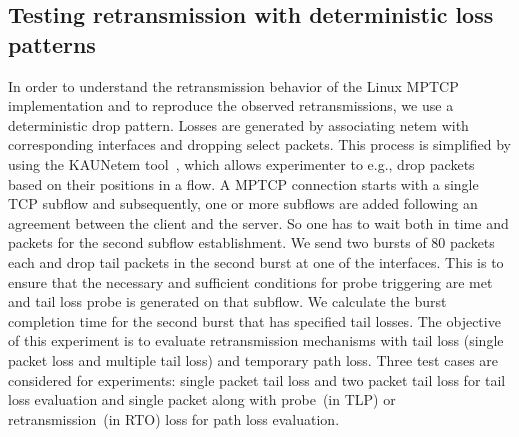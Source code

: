 \documentclass[10pt,conference]{IEEEtran}
\begin{document}
\begin{center}
\begin{table}
\end{table}
\end{center}


\subsection{Testing retransmission with deterministic loss patterns}
In order to understand the retransmission behavior of the Linux MPTCP implementation and to reproduce the observed retransmissions, we use a deterministic drop pattern. Losses are generated by associating netem with corresponding interfaces and dropping select packets. This process is simplified by using the KAUNetem tool~\cite{Garcia2016}, which allows experimenter to e.g., drop packets based on their positions in a flow. A MPTCP connection starts with a single TCP subflow and subsequently, one or more subflows are added following an agreement between the client and the server. So one has to wait both in time and packets for the second subflow establishment. We send two bursts of 80 packets each and drop tail packets in the second burst at one of the interfaces. This is to ensure that the necessary and sufficient conditions for probe triggering are met and tail loss probe is generated on that subflow. We calculate the burst completion time for the second burst that has specified tail losses. The objective of this experiment is to evaluate retransmission mechanisms with tail loss (single packet loss and multiple tail loss) and temporary path loss. Three test cases are considered for experiments: single packet tail loss and two packet tail loss for tail loss evaluation and single packet along with probe~(in TLP) or retransmission~(in RTO) loss for path loss evaluation. 
\end{document}
